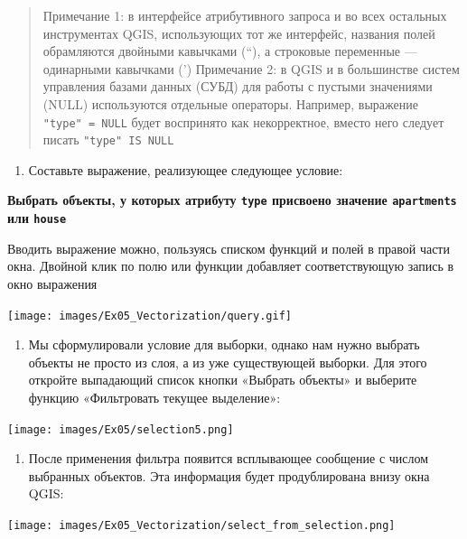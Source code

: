 \documentclass[
  12pt,
]{book}
\providecommand{\tightlist}{%
  \setlength{\itemsep}{0pt}\setlength{\parskip}{0pt}}
\begin{document}
\begin{quote}
Примечание 1: в интерфейсе атрибутивного запроса и во всех остальных инструментах QGIS, использующих тот же интерфейс, названия полей обрамляются двойными кавычками (``), а строковые переменные --- одинарными кавычками (')
Примечание 2: в QGIS и в большинстве систем управления базами данных (СУБД) для работы с пустыми значениями (NULL) используются отдельные операторы. Например, выражение \texttt{"type"\ =\ NULL} будет воспринято как некорректное, вместо него следует писать \texttt{"type"\ IS\ NULL}
\end{quote}

\begin{enumerate}
\def\labelenumi{\arabic{enumi}.}
\setcounter{enumi}{6}
\tightlist
\item
  Составьте выражение, реализующее следующее условие:
\end{enumerate}

\textbf{Выбрать объекты, у которых атрибуту \texttt{type} присвоено значение \texttt{apartments} или \texttt{house}}

Вводить выражение можно, пользуясь списком функций и полей в правой части окна. Двойной клик по полю или функции добавляет соответствующую запись в окно выражения

\texttt{[image: images/Ex05\_Vectorization/query.gif]}

\begin{enumerate}
\def\labelenumi{\arabic{enumi}.}
\setcounter{enumi}{10}
\tightlist
\item
  Мы сформулировали условие для выборки, однако нам нужно выбрать объекты не просто из слоя, а из уже существующей выборки. Для этого откройте выпадающий список кнопки «Выбрать объекты» и выберите функцию «Фильтровать текущее выделение»:
\end{enumerate}

\texttt{[image: images/Ex05/selection5.png]}

\begin{enumerate}
\def\labelenumi{\arabic{enumi}.}
\setcounter{enumi}{11}
\tightlist
\item
  После применения фильтра появится всплывающее сообщение с числом выбранных объектов. Эта информация будет продублирована внизу окна QGIS:
\end{enumerate}

\texttt{[image: images/Ex05\_Vectorization/select\_from\_selection.png]}
\end{document}
